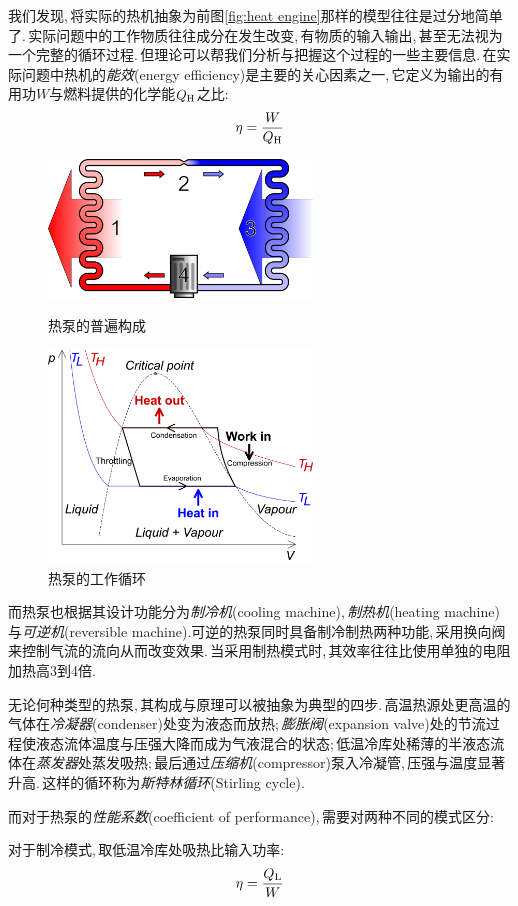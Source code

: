 我们发现,\,将实际的热机抽象为前图\ref{fig:heat engine}那样的模型往往是过分地简单了.\,实际问题中的工作物质往往成分在发生改变,\,有物质的输入输出,\,甚至无法视为一个完整的循环过程.\,但理论可以帮我们分析与把握这个过程的一些主要信息.\,在实际问题中热机的\emph{能效}(energy efficiency)是主要的关心因素之一,\,它定义为输出的有用功$W$与燃料提供的化学能$Q_{\rm H}$之比:
\[\eta=\frac{W}{Q_{\rm H}}\]

\begin{figure}
\centering
\includegraphics[width=7cm]{image/5-2-4.png}
\caption{热泵的普遍构成}
\vspace{1cm}
\includegraphics[width=7cm]{image/5-2-5.png}
\caption{热泵的工作循环}
\end{figure}
而热泵也根据其设计功能分为\emph{制冷机}(cooling machine),\,\emph{制热机}(heating machine)与\emph{可逆机}(reversible machine).可逆的热泵同时具备制冷制热两种功能,\,采用换向阀来控制气流的流向从而改变效果.\,当采用制热模式时,\,其效率往往比使用单独的电阻加热高3到4倍.

无论何种类型的热泵,\,其构成与原理可以被抽象为典型的四步.\,高温热源处更高温的气体在\emph{冷凝器}(condenser)处变为液态而放热;\,\emph{膨胀阀}(expansion valve)处的节流过程使液态流体温度与压强大降而成为气液混合的状态;\,低温冷库处稀薄的半液态流体在\emph{蒸发器}处蒸发吸热;\,最后通过\emph{压缩机}(compressor)泵入冷凝管,\,压强与温度显著升高.\,这样的循环称为\emph{斯特林循环}(Stirling cycle).


而对于热泵的\emph{性能系数}(coefficient of performance),\,需要对两种不同的模式区分:

对于制冷模式,\,取低温冷库处吸热比输入功率:
\[\eta=\frac{Q_{\rm L}}{W}\]

